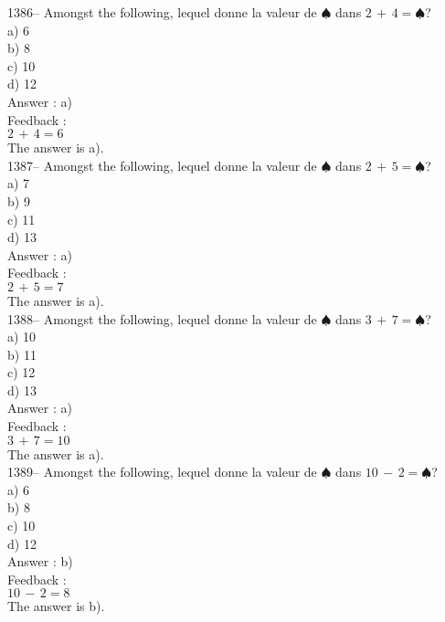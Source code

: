 \documentclass[letterpaper, 12pt]{article}
\begin{document}
1386-- Amongst the following, lequel donne la valeur de
$\spadesuit$ dans $2\,+\,4=\spadesuit$?\\
a) 6\\
b) 8\\
c) 10\\
d) 12\\

Answer : a)\\

Feedback : \\
$2\,+\,4=6$\\
The answer is a).\\

1387-- Amongst the following, lequel donne la valeur de
$\spadesuit$ dans $2\,+\,5=\spadesuit$?\\
a) 7\\
b) 9\\
c) 11\\
d) 13\\

Answer : a)\\

Feedback : \\
$2\,+\,5=7$\\
The answer is a).\\

1388-- Amongst the following, lequel donne la valeur de
$\spadesuit$ dans $3\,+\,7=\spadesuit$?\\
a) 10\\
b) 11\\
c) 12\\
d) 13\\

Answer : a)\\

Feedback : \\
$3\,+\,7=10$\\
The answer is a).\\

1389-- Amongst the following, lequel donne la valeur de
$\spadesuit$ dans $10\,-\,2=\spadesuit$?\\
a) 6\\
b) 8\\
c) 10\\
d) 12\\

Answer : b)\\

Feedback : \\
$10\,-\,2=8$\\
The answer is b).\\
\end{document}
